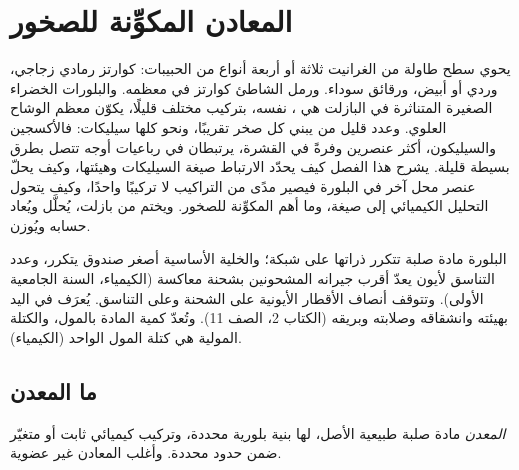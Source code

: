 \chapter{المعادن المكوِّنة للصخور}\label{ch:b1:rock-forming-minerals}

يحوي سطح طاولة من الغرانيت ثلاثة أو أربعة أنواع من الحبيبات: كوارتز رمادي زجاجي،  وردي أو أبيض، ورقائق  سوداء. ورمل الشاطئ كوارتز في معظمه. والبلورات الخضراء الصغيرة المتناثرة في البازلت هي ،  نفسه، بتركيب مختلف قليلًا، يكوّن معظم الوشاح العلوي. وعدد قليل من  يبني كل صخر تقريبًا، ونحو كلها سيليكات: فالأكسجين والسيليكون، أكثر عنصرين وفرةً في القشرة، يرتبطان في رباعيات أوجه تتصل بطرق بسيطة قليلة. يشرح هذا الفصل كيف يحدّد الارتباط صيغة السيليكات وهيئتها، وكيف يحلّ عنصر محل آخر في البلورة فيصير  مدًى من التراكيب لا تركيبًا واحدًا، وكيف يتحول التحليل الكيميائي إلى صيغة، وما أهم  المكوِّنة للصخور. ويختم  من بازلت، يُحلَّل ويُعاد حسابه ويُوزن.

\begin{recall}
البلورة مادة صلبة تتكرر ذراتها على شبكة؛ والخلية الأساسية أصغر صندوق يتكرر، وعدد التناسق لأيون يعدّ أقرب جيرانه المشحونين بشحنة معاكسة (الكيمياء، السنة الجامعية الأولى). وتتوقف أنصاف الأقطار الأيونية على الشحنة وعلى التناسق.  يُعرَف في اليد بهيئته وانشقاقه وصلابته وبريقه (الكتاب 2، الصف 11). وتُعدّ كمية المادة بالمول، والكتلة المولية هي كتلة المول الواحد (الكيمياء).
\end{recall}

\section{ما المعدن}

\begin{definition}[المعدن]\label{def:b1:rock-forming-minerals:mineral}
\emph{المعدن} مادة صلبة طبيعية الأصل، لها بنية بلورية محددة، وتركيب كيميائي ثابت أو متغيّر ضمن حدود محددة. وأغلب المعادن غير عضوية.
\end{definition}

